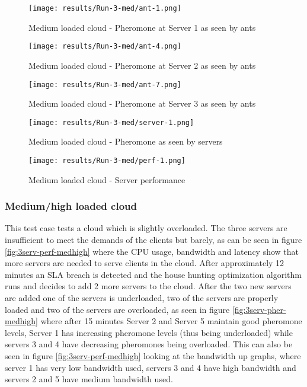 \begin{figure}
	\centering
		\texttt{[image: results/Run-3-med/ant-1.png]}
	\caption{Medium loaded cloud - Pheromone at Server 1 as seen by ants}
	\label{fig:3serv-ant1-med}
\end{figure}

\begin{figure}
	\centering
		\texttt{[image: results/Run-3-med/ant-4.png]}
	\caption{Medium loaded cloud - Pheromone at Server 2 as seen by ants}
	\label{fig:3serv-ant4-med}
\end{figure}

\begin{figure}
	\centering
		\texttt{[image: results/Run-3-med/ant-7.png]}
	\caption{Medium loaded cloud - Pheromone at Server 3 as seen by ants}
	\label{fig:3serv-ant7-med}
\end{figure}

\begin{figure}
	\centering
		\texttt{[image: results/Run-3-med/server-1.png]}
	\caption{Medium loaded cloud - Pheromone as seen by servers}
	\label{fig:3serv-pher-med}
\end{figure}

\begin{figure}
	\centering
		\texttt{[image: results/Run-3-med/perf-1.png]}
	\caption{Medium loaded cloud - Server performance}
	\label{fig:3serv-perf-med}
\end{figure}

\subsubsection{Medium/high loaded cloud}

This test case tests a cloud which is slightly overloaded. The three servers are insufficient to meet the demands of the clients but barely, as can be seen in figure \ref{fig:3serv-perf-medhigh} where the CPU usage, bandwidth and latency show that more servers are needed to serve clients in the cloud. After approximately 12 minutes an SLA breach is detected and the house hunting optimization algorithm runs and decides to add 2 more servers to the cloud. After the two new servers are added one of the servers is underloaded, two of the servers are properly loaded and two of the servers are overloaded, as seen in figure \ref{fig:3serv-pher-medhigh} where after 15 minutes Server 2 and Server 5 maintain good pheromone levels, Server 1 has increasing pheromone levels (thus being underloaded) while servers 3 and 4 have decreasing pheromones being overloaded. This can also be seen in figure \ref{fig:3serv-perf-medhigh} looking at the bandwidth up graphs, where server 1 has very low bandwidth used, servers 3 and 4 have high bandwidth and servers 2 and 5 have medium bandwidth used.

